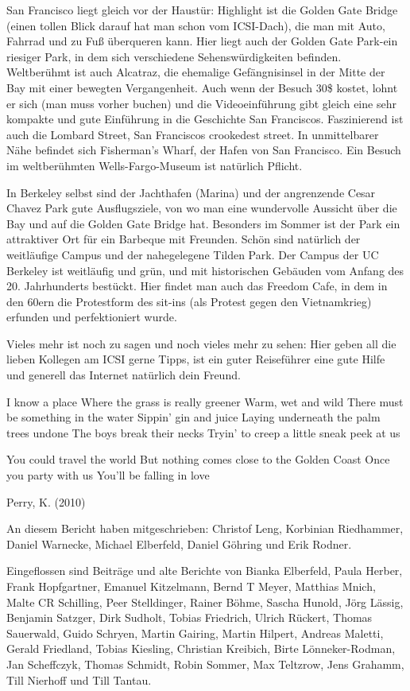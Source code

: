 \documentclass[a4paper]{scrreprt}
\begin{document}
San Francisco liegt gleich vor der Haustür: Highlight ist die Golden Gate Bridge (einen tollen Blick darauf hat man schon vom ICSI-Dach), die man mit Auto, Fahrrad und zu Fuß überqueren kann. Hier liegt auch der Golden Gate Park-ein riesiger Park, in dem sich verschiedene Sehenswürdigkeiten befinden. Weltberühmt ist auch Alcatraz, die ehemalige Gefängnisinsel in der Mitte der Bay mit einer bewegten Vergangenheit. Auch wenn der Besuch 30\$ kostet, lohnt er sich (man muss vorher buchen) und die Videoeinführung gibt gleich eine sehr kompakte und gute Einführung in die Geschichte San Franciscos. Faszinierend ist auch die Lombard Street, San Franciscos crookedest street. In unmittelbarer Nähe befindet sich Fisherman's Wharf, der Hafen von San Francisco. Ein Besuch im weltberühmten Wells-Fargo-Museum ist natürlich Pflicht.

In Berkeley selbst sind der Jachthafen (Marina) und der angrenzende Cesar Chavez Park gute Ausflugsziele, von wo man eine wundervolle Aussicht über die Bay und auf die Golden Gate Bridge hat. Besonders im Sommer ist der Park ein attraktiver Ort für ein Barbeque mit Freunden. Schön sind natürlich der weitläufige Campus und der nahegelegene Tilden Park. Der Campus der UC Berkeley ist weitläufig und grün, und mit historischen Gebäuden vom Anfang des 20. Jahrhunderts bestückt. Hier findet man auch das Freedom Cafe, in dem in den 60ern die Protestform des sit-ins (als Protest gegen den Vietnamkrieg) erfunden und perfektioniert wurde.

Vieles mehr ist noch zu sagen und noch vieles mehr zu sehen: Hier geben all die lieben Kollegen am ICSI gerne Tipps, ist ein guter Reiseführer eine gute Hilfe und generell das Internet natürlich dein Freund.

\clearpage

 


I know a place
Where the grass is really greener
Warm, wet and wild
There must be something in the water
Sippin' gin and juice
Laying underneath the palm trees undone
The boys break their necks
Tryin' to creep a little sneak peek at us

You could travel the world
But nothing comes close to the Golden Coast
Once you party with us
You'll be falling in love



Perry, K. (2010)

\clearpage

An diesem Bericht haben mitgeschrieben: Christof Leng, Korbinian
Riedhammer, Daniel Warnecke, Michael Elberfeld, Daniel Göhring und
Erik Rodner. 

Eingeflossen sind Beiträge und alte Berichte von Bianka Elberfeld,
Paula Herber, Frank Hopfgartner, Emanuel Kitzelmann, Bernd T Meyer,
Matthias Mnich, Malte CR Schilling, Peer Stelldinger, Rainer Böhme,
Sascha Hunold, Jörg Lässig, Benjamin Satzger, Dirk Sudholt, Tobias
Friedrich, Ulrich Rückert, Thomas Sauerwald, Guido Schryen, Martin
Gairing, Martin Hilpert, Andreas Maletti, Gerald Friedland, Tobias
Kiesling, Christian Kreibich, Birte Lönneker-Rodman, Jan Scheffczyk,
Thomas Schmidt, Robin Sommer, Max Teltzrow, Jens Grahamm, Till
Nierhoff und Till Tantau.
\end{document}
